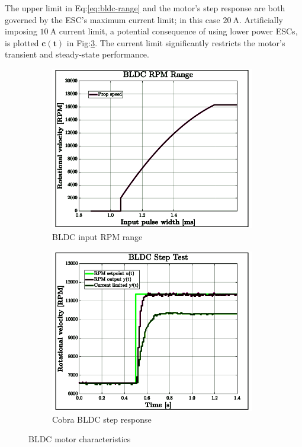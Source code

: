 The upper limit in Eq:\ref{eq:bldc-range} and the motor's step response are both governed by the ESC's maximum current limit; in this case $20~\text{A}$. Artificially imposing $10~\text{A}$ current limit, a potential consequence of using lower power ESCs, is plotted {\color{YellowGreen}$\mathbf{c(t)}$} in Fig:\ref{fig:bldc-step}. The current limit significantly restricts the motor's transient and steady-state performance. 
\begin{figure}[hbtp]
\begin{subfigure}{0.5\textwidth}
\centering
\includegraphics[width=0.98\textwidth]{graphs/bldc-range}
\caption{BLDC input RPM range}
\label{fig:bldc-range}
\end{subfigure}
\begin{subfigure}{0.5\textwidth}
\centering
\includegraphics[width=0.98\textwidth]{graphs/BLDC-step}
\caption{Cobra BLDC step response}
\label{fig:bldc-step}
\end{subfigure}
\caption{BLDC motor characteristics}
\end{figure}
